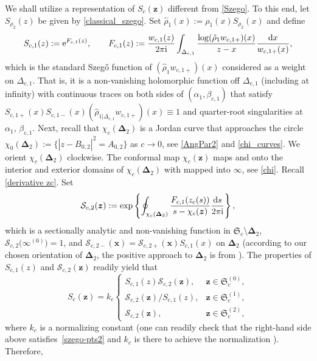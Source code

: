 \documentclass[pdftex]{sigma}
\numberwithin{equation}{section}
\newcommand{\ic}{\mathrm{i}}
\newcommand{\RS}{\boldsymbol{\mathfrak{S}}}
\newcommand{\z}	{{\boldsymbol z}}
\newcommand{\x}	{{\boldsymbol x}}
\begin{document}
We shall utilize a representation of $ S_c(\z) $ different from \eqref{Szego}. To this end, let $ S_{\rho_2}(z) $ be given by \eqref{classical_szego}. Set $ \hat\rho_1(x) := \rho_1(x)S_{\rho_2}(x) $ and define
\[
S_{c,1}(z) := {\rm e}^{F_{c,1}(z)}, \qquad F_{c,1}(z) := \frac{w_{c,1}(z)}{2\pi\ic}\int_{\Delta_{c,1}}\frac{\log(\hat\rho_1w_{c,1+})(x)}{z-x}\frac{{\rm d}x}{w_{c,1+}(x)},
\]
which is the standard Szeg\H{o} function of $ (\hat\rho_1w_{c,1+})(x)$ considered as a weight on $ \Delta_{c,1} $. That is, it is a non-vanishing holomorphic function off $ \Delta_{c,1} $ (including at infinity) with continuous traces on both sides of $ (\alpha_1,\beta_{c,1}) $ that satisfy
$
S_{c,1+}(x)S_{c,1-}(x) (\hat\rho_{1|\Delta_{c,1}}w_{c,1+})(x) \equiv 1
$
and quarter-root singularities at $ \alpha_1$, $\beta_{c,1} $. Next, recall that $ \chi_c(\boldsymbol\Delta_2) $ is a Jordan curve that approaches the circle~${ \chi_0(\boldsymbol\Delta_2) := \bigl\{|z-B_{0,2}|^2=A_{0,2}\bigr\}} $ as $ c\to0 $, see \eqref{AngPar2} and \eqref{chi_curves}. We orient $ \chi_c(\boldsymbol\Delta_2) $ clockwise. The conformal map $ \chi_c(\z) $ maps \smash{$ \RS_c^{(2)}\setminus\boldsymbol\Delta_2 $} and \smash{$ \RS_c\setminus \RS_c^{(2)} $} onto the interior and exterior domains of $ \chi_c(\boldsymbol\Delta_2) $ with  mapped into $ \infty $, see \eqref{chi}. Recall \eqref{derivative zc}. Set
\[
\mathcal S_{c,2}(\z) := \exp\left\{\oint_{\chi_c(\boldsymbol\Delta_2)}\frac{F_{c,1}(z_c(s))}{s-\chi_c(\z)}\frac{{\rm d}s}{2\pi\ic}\right\},
\]
which is a sectionally analytic and non-vanishing function in $ \RS_c\setminus\boldsymbol\Delta_2 $, $ \mathcal S_{c,2}\bigl(\infty^{(0)}\bigr) = 1 $, and $ \mathcal S_{c,2-}(\x) = \mathcal S_{c,2+}(\x) S_{c,1}(x) $ on $ \boldsymbol\Delta_2 $ (according to our chosen orientation of $ \boldsymbol\Delta_2 $, the positive approach to $ \boldsymbol\Delta_2 $ is from \smash{$ \RS_c^{(0)} $}). The properties of $ S_{c,1}(z) $ and $ \mathcal S_{c,2}(\z) $ readily yield that
\[
S_c(\z) = k_c\begin{cases}
S_{c,1}(z)\mathcal S_{c,2}(\z), & \z\in\RS_c^{(0)}, \\
\mathcal S_{c,2}(\z)/S_{c,1}(z), & \z\in\RS_c^{(1)}, \\
\mathcal S_{c,2}(\z), & \z\in\RS_c^{(2)},
\end{cases}
\]
where $ k_c $ is a normalizing constant \big(one can readily check that the right-hand side above satisfies~\eqref{szego-pts2} and $ k_c $ is there to achieve the normalization \big). Therefore,
\end{document}
